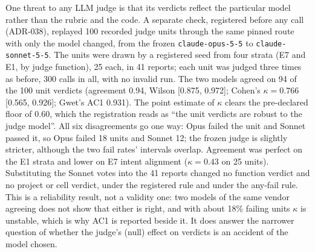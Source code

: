\documentclass[10pt,a4paper]{article}
\begin{document}
One threat to any LLM judge is that its verdicts reflect the particular model rather than the rubric and the code.
A separate check, registered before any call (ADR-038), replayed 100 recorded judge units through the same pinned
route with only the model changed, from the frozen \texttt{claude-opus-5-5} to \texttt{claude-sonnet-5-5}. The
units were drawn by a registered seed from four strata (E7 and E1, by judge function), 25 each, in 41 reports; each
unit was judged three times as before, 300 calls in all, with no invalid run.
The two models agreed on 94 of the 100 unit verdicts (agreement 0.94, Wilson [0.875, 0.972]; Cohen's
$\kappa = 0.766$ [0.565, 0.926]; Gwet's AC1 0.931). The point estimate of $\kappa$ clears the pre-declared floor of
0.60, which the registration reads as ``the unit verdicts are robust to the judge model''.
All six disagreements go one way: Opus failed the unit and Sonnet passed it, so Opus failed 18 units and Sonnet
12; the frozen judge is slightly stricter, although the two fail rates' intervals overlap. Agreement was perfect on
the E1 strata and lower on E7 intent alignment ($\kappa = 0.43$ on 25 units). Substituting the Sonnet votes into the
41 reports changed no function verdict and no project or cell verdict, under the registered rule and under the
any-fail rule.
This is a reliability result, not a validity one: two models of the same vendor agreeing does not show that either
is right, and with about 18\% failing units $\kappa$ is unstable, which is why AC1 is reported beside it. It does
answer the narrower question of whether the judge's (null) effect on verdicts is an accident of the model chosen.
\end{document}

